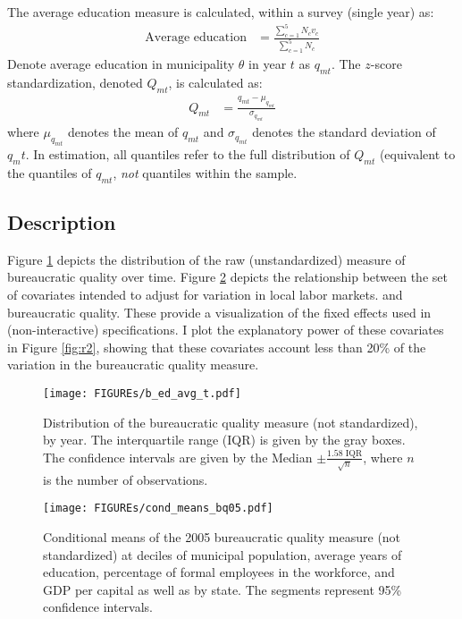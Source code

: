\documentclass[11pt,english]{article}
\begin{document}
The average education measure is calculated, within a survey (single year) as:
\begin{align}
\text{Average education} &= \frac{\sum_{c=1}^5 N_c v_c}{\sum_{c = 1}^5 N_c}
\end{align}
Denote average education in municipality $\theta$ in year $t$ as $q_{mt}$. The $z$-score standardization, denoted $Q_{mt}$, is calculated as:
\begin{align}
Q_{mt} &= \frac{q_{mt} - \mu_{q_{mt}}}{\sigma_{q_{mt}}}
\end{align}
where $\mu_{q_{mt}}$ denotes the mean of $q_{mt}$ and $\sigma_{q_{mt}}$ denotes the standard deviation of $q_mt$. In estimation, all quantiles refer to the full distribution of $Q_{mt}$ (equivalent to the quantiles of $q_{mt}$, \textit{not} quantiles within the sample. 

\subsection{Description}

Figure \ref{fig:bq_avg_ed_t} depicts the distribution of the raw (unstandardized) measure of bureaucratic quality over time. Figure \ref{bq_cond_means} depicts the relationship between the set of covariates intended to adjust for variation in local labor markets. and bureaucratic quality. These provide a visualization of the fixed effects used in (non-interactive) specifications. I plot the explanatory power of these covariates in Figure \ref{fig:r2}, showing that these covariates account less than 20\% of the variation in the bureaucratic quality measure. 

\begin{figure}
\centering
\texttt{[image: FIGUREs/b\_ed\_avg\_t.pdf]}
\caption{Distribution of the bureaucratic quality measure (not standardized), by year. The interquartile range (IQR) is given by the gray boxes. The confidence intervals are given by the Median $\pm \frac{1.58 \text{ IQR}}{\sqrt{n}}$, where $n$ is the number of observations.}\label{fig:bq_avg_ed_t}
\end{figure}


\begin{figure}
\texttt{[image: FIGUREs/cond\_means\_bq05.pdf]}
\caption{Conditional means of the 2005 bureaucratic quality measure (not standardized) at deciles of municipal population, average years of education, percentage of formal employees in the workforce, and GDP per capital as well as by state. The segments represent 95\% confidence intervals.}\label{bq_cond_means}
\end{figure}
\end{document}

